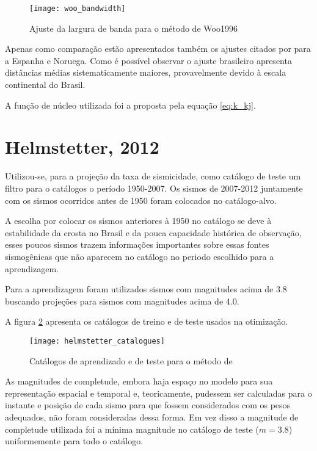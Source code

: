 \begin{figure}[H]
  \centering
  \texttt{[image: woo\_bandwidth]} 
  \caption{Ajuste da largura de banda para o método de Woo1996}
  \label{fig:woo_b} 
\end{figure}

Apenas como comparação estão apresentados também os ajustes citados por \citet{beauval_2003} para a Espanha e Noruega.
Como é possível observar o ajuste brasileiro apresenta distâncias médias sistematicamente maiores, provavelmente
devido à escala continental do Brasil.

A função de núcleo utilizada foi a proposta pela equação \eqref{eq:k_kj}.

\section{Helmstetter, 2012}
\label{sec:proc_helmstetter}

Utilizou-se, para a projeção da taxa de sismicidade, como catálogo de teste
um filtro para o catálogos o período 1950-2007. Os sismos de 2007-2012 juntamente
com os sismos ocorridos antes de 1950 foram colocados no catálogo-alvo.

A escolha por colocar os sismos anteriores à 1950 no catálogo se deve à estabilidade
da crosta no Brasil e da pouca capacidade histórica de observação,
esses poucos sismos trazem informações importantes sobre essas fontes
sismogênicas que não aparecem no catálogo no periodo escolhido para a aprendizagem.

Para a aprendizagem foram utilizados sismos com magnitudes acima de 3.8 buscando projeções para
sismos com magnitudes acima de 4.0.

A figura \ref{fig:h_catalogue} apresenta os catálogos de treino e de teste usados na otimização.

\begin{figure}[H]
  \centering
  \texttt{[image: helmstetter\_catalogues]} 
  \caption{Catálogos de aprendizado e de teste para o método de \citet{helmstetter_2012}}
  \label{fig:h_catalogue} 
\end{figure}

As magnitudes de completude, embora haja espaço no modelo para sua representação espacial e temporal
e, teoricamente, pudessem ser calculadas para o instante e posição de cada sismo para que fossem
considerados com os pesos adequados, não foram consideradas dessa forma. Em vez disso a magnitude
de completude utilizada foi a mínima magnitude no catálogo de teste ($m=3.8$) uniformemente para todo o catálogo.

